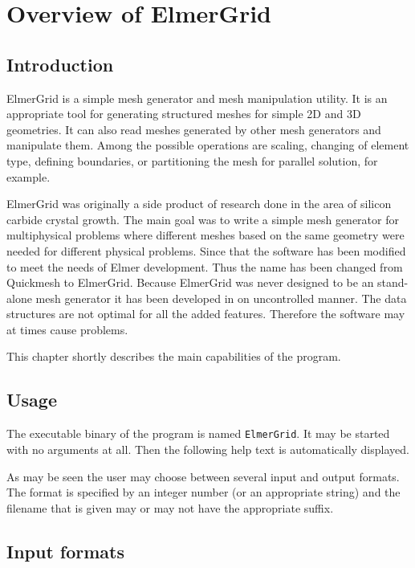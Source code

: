\chapter{Overview of ElmerGrid}

\section{Introduction}

ElmerGrid is a simple mesh generator and 
mesh manipulation utility. 
It is an appropriate tool for generating structured meshes for 
simple 2D and 3D geometries. 
It can also read meshes generated by other mesh generators and 
manipulate them. Among the possible operations are
scaling, changing of element type, 
defining boundaries, or partitioning the mesh for parallel solution, 
for example.

ElmerGrid was originally a side product of research done in the area
of silicon carbide crystal growth.
The main goal was to write a simple mesh generator for multiphysical
problems where different meshes based on the same geometry were needed for different physical problems.
Since that the software has been modified to meet the 
needs of Elmer development.
Thus the name has been changed from Quickmesh to ElmerGrid.
Because ElmerGrid was never designed to be an stand-alone mesh generator 
it has been developed in on uncontrolled manner. The data structures 
are not optimal for all the added features. Therefore the software may
at times cause problems.

This chapter shortly describes the main 
capabilities of the program.


\section{Usage}
The executable binary of the program is named {\tt ElmerGrid}.
It may be started with no arguments at
all. Then the following help text is automatically 
displayed.



As may be seen the user may choose between several 
input and output formats. The format is specified 
by an integer number (or an appropriate string) and the filename that is given may 
or may not have the appropriate suffix.


\section{Input formats}

